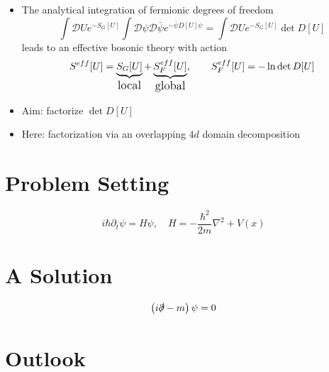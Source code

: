 \documentclass[11pt,aspectratio=43]{beamer}
\begin{document}
\begin{frame}{}

\begin{itemize}
    \item The analytical integration of fermionic degrees of freedom
    \begin{equation*}
        \int \mathcal{D} U e^{-S_G[U]} \int \mathcal{D} \psi \mathcal{D} \bar\psi e^{-\bar\psi D[U] \psi} = \int \mathcal{D} U e^{-S_G[U]} \det D[U]
    \end{equation*}
    leads to an effective bosonic theory with action
    \begin{equation*}
        S^{eff}[U] = \underbrace{S_G[U]}_\text{\large{local}} + \underbrace{S_F^{eff}[U]}_\text{\large{global}}, \qquad S_F^{eff}[U] = - \ln{\det D[U]}
    \end{equation*}
    \item Aim: factorize $\det D[U]$
    \item Here: factorization via an overlapping $4d$ domain decomposition \cite{GIUSTI2022137103}
\end{itemize}
\end{frame}

\section{Problem Setting}


\begin{frame}{}
\centering
\begin{equation*}
	i \hbar \partial_t \psi = H \psi, \quad H = -\frac{\hbar^2}{2m}\nabla^2 + V(x)
\end{equation*}
\end{frame}

\section{A Solution}


\begin{frame}{}
\centering
\begin{equation*}
	\left( i \slashed{\partial} - m \right) \psi = 0
\end{equation*}
\end{frame}


\section{Outlook}
\end{document}
